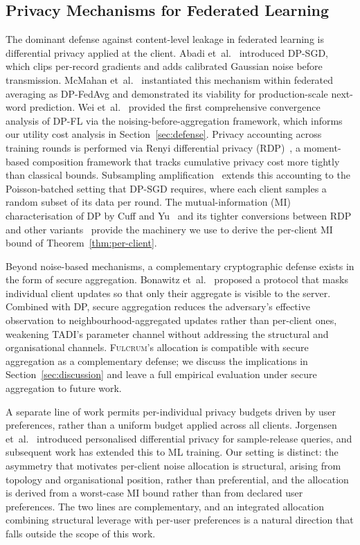 \documentclass[letterpaper,journal]{IEEEtran}
\newcommand{\TADI}{\textsc{TADI}\xspace}
\newcommand{\Fulcrum}{\textsc{Fulcrum}\xspace}
\begin{document}
\subsection{Privacy Mechanisms for Federated Learning}
\label{sec:related-defense}

The dominant defense against content-level leakage in federated
learning is differential privacy applied at the client. Abadi
et~al.~\cite{abadi2016dpsgd} introduced DP-SGD, which clips
per-record gradients and adds calibrated Gaussian noise before
transmission. McMahan et~al.~\cite{mcmahan2018dpfedavg} instantiated
this mechanism within federated averaging as DP-FedAvg and
demonstrated its viability for production-scale next-word prediction.
Wei et~al.~\cite{wei2020nbafl} provided the first comprehensive
convergence analysis of DP-FL via the noising-before-aggregation
framework, which informs our utility cost analysis in
Section~\ref{sec:defense}. Privacy accounting across training rounds
is performed via Renyi differential privacy
(RDP)~\cite{mironov2017rdp}, a moment-based composition framework
that tracks cumulative privacy cost more tightly than classical
bounds. Subsampling amplification~\cite{wang2019subsampled} extends
this accounting to the Poisson-batched setting that DP-SGD requires,
where each client samples a random subset of its data per round. The
mutual-information (MI) characterisation of DP by Cuff and
Yu~\cite{cuff2016mi} and its tighter conversions between RDP and
other variants~\cite{asoodeh2021variants} provide the machinery we
use to derive the per-client MI bound of
Theorem~\ref{thm:per-client}.

Beyond noise-based mechanisms, a complementary cryptographic defense
exists in the form of secure aggregation. Bonawitz
et~al.~\cite{bonawitz2017secagg} proposed a protocol that masks
individual client updates so that only their aggregate is visible to
the server. Combined with DP, secure aggregation reduces the
adversary's effective observation to neighbourhood-aggregated updates
rather than per-client ones, weakening \TADI's parameter channel
without addressing the structural and organisational channels.
\Fulcrum's allocation is compatible with secure aggregation as a
complementary defense; we discuss the implications in
Section~\ref{sec:discussion} and leave a full empirical evaluation
under secure aggregation to future work.

A separate line of work permits per-individual privacy budgets driven
by user preferences, rather than a uniform budget applied across all
clients. Jorgensen et~al.~\cite{jorgensen2015personalized} introduced
personalised differential privacy for sample-release queries, and
subsequent work has extended this to ML training. Our setting is
distinct: the asymmetry that motivates per-client noise allocation is
structural, arising from topology and organisational position, rather
than preferential, and the allocation is derived from a worst-case MI
bound rather than from declared user preferences. The two lines are
complementary, and an integrated allocation combining structural
leverage with per-user preferences is a natural direction that falls
outside the scope of this work.
\end{document}
